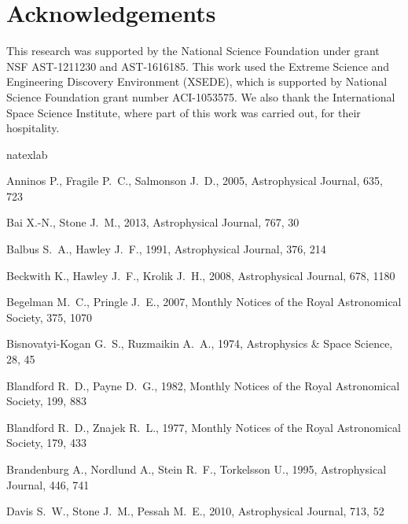 \documentclass[useAMS,usenatbib]{mn2e}
\newcommand\apj{Astrophysical Journal}
\newcommand\apss{Astrophysics \& Space Science}
\newcommand\mnras{Monthly Notices of the Royal Astronomical Society}
\begin{document}
 
\section{Acknowledgements}

This research was supported by the National Science Foundation under grant NSF AST-1211230 and AST-1616185.  This work used the Extreme Science and Engineering Discovery Environment (XSEDE), which is supported by National Science Foundation grant number ACI-1053575.  We also thank the International Space Science Institute, where part of this work was carried out, for their hospitality.

 

%
\begin{thebibliography}{33}
\expandafter\ifx\csname natexlab\endcsname\relax\def\natexlab#1{#1}\fi

{Anninos} P., {Fragile} P.~C., {Salmonson} J.~D., 2005, \apj, 635, 723

{Bai} X.-N., {Stone} J.~M., 2013, \apj, 767, 30

{Balbus} S.~A., {Hawley} J.~F., 1991, \apj, 376, 214

{Beckwith} K., {Hawley} J.~F., {Krolik} J.~H., 2008, \apj, 678, 1180

{Begelman} M.~C., {Pringle} J.~E., 2007, \mnras, 375, 1070

{Bisnovatyi-Kogan} G.~S., {Ruzmaikin} A.~A., 1974, \apss, 28, 45

{Blandford} R.~D., {Payne} D.~G., 1982, \mnras, 199, 883

{Blandford} R.~D., {Znajek} R.~L., 1977, \mnras, 179, 433

{Brandenburg} A., {Nordlund} A., {Stein} R.~F., {Torkelsson} U., 1995, \apj,
  446, 741

{Davis} S.~W., {Stone} J.~M., {Pessah} M.~E., 2010, \apj, 713, 52


\end{thebibliography}
\end{document}
